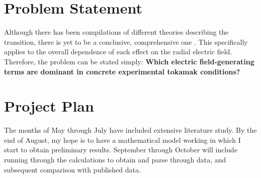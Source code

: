 \documentclass[a4paper]{article}
\begin{document}

\section{Problem Statement}
Although there has been compilations of different theories describing the transition, there is yet to be a conclusive, comprehensive one \cite{connor_review_2000}.
This specifically applies to the overall dependence of each effect on the radial electric field.
Therefore, the problem can be stated simply: \textbf{Which electric field-generating terms are dominant in concrete experimental tokamak conditions?}


\section{Project Plan}
The months of May through July have included extensive literature study.
By the end of August, my hope is to have a mathematical model working in which I start to obtain preliminary results.
September through October will include running through the calculations to obtain and parse through data, and subsequent comparison with published data.




\end{document}
